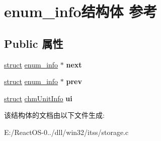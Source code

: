 \hypertarget{structenum__info}{}\section{enum\+\_\+info结构体 参考}
\label{structenum__info}
\subsection*{Public 属性}
\begin{DoxyCompactItemize}
\item 
\mbox{\label{structenum__info_a41fdf58ee42b9f93d5ddaa24adbbf06b}} 
\hyperlink{interfacestruct}{struct} \hyperlink{structenum__info}{enum\+\_\+info} $\ast$ {\bfseries next}
\item 
\mbox{\label{structenum__info_a6b2723064e677a85e37e94c55fdfe2ff}} 
\hyperlink{interfacestruct}{struct} \hyperlink{structenum__info}{enum\+\_\+info} $\ast$ {\bfseries prev}
\item 
\mbox{\label{structenum__info_aa638f9f0a7dfd16f3e92c469bb7189ab}} 
\hyperlink{interfacestruct}{struct} \hyperlink{structchm_unit_info}{chm\+Unit\+Info} {\bfseries ui}
\end{DoxyCompactItemize}


该结构体的文档由以下文件生成\+:\begin{DoxyCompactItemize}
\item 
E\+:/\+React\+O\+S-\/0../dll/win32/itss/storage.\+c\end{DoxyCompactItemize}
